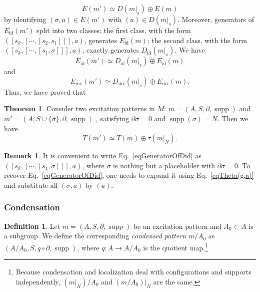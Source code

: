 \documentclass[reprint, amsmath, amssymb, showpacs, floatfix, longbibliography, aps, twocolumn, superscriptaddress, nofootinbib]{revtex4-2}
\newcommand{\supp}{\operatorname{supp}}
\newcommand{\id}{{\operatorname{id}}}
\newcommand{\inv}{{\operatorname{inv}}}
\theoremstyle{definition}
\newtheorem{theorem}{Theorem}[section]
\newtheorem{definition}{Definition}[section]
\newtheorem{remark}{Remark}[section]
\begin{document}
\begin{equation}\label{eqDecomposeD}
	E(m')\simeq D(m|_s)\oplus E(m)
\end{equation}
 by identifying $(\sigma,a)\in E(m')$ with $(a)\in D(m|_s)$. Moreover, generators of $E_{\operatorname{id}}(m')$ split into two classes: the first class, with the form $([s_k,[\cdots,[s_2,s_1]]],a)$, generates $E_{\operatorname{id}}(m)$; the second class, with the form $([s_k,[\cdots,[s_1,\sigma]]],a)$, exactly generates $D_\id(m|_s)$. We have
 \begin{equation}
 	E_\id(m')\simeq D_\id(m|_s)\oplus E_\id(m)
 \end{equation}
 and
\begin{equation}
	E_\inv(m')\simeq D_\inv(m|_s)\oplus E_\inv(m).
\end{equation}
Thus, we have proved that
\begin{theorem}\label{thmSymmetryOperator}
	Consider two excitation patterns in $M$: $m=(A,S,\partial,\supp)$ and $m'=(A,S\cup \{\sigma\},\partial,\supp)$ , satisfying $\partial\sigma=0$ and $\supp(\sigma)=N$. Then we have
	\begin{equation}
		T(m')\simeq T(m)\oplus\tau(m|_N).
	\end{equation}
	
\end{theorem}

\begin{remark}\label{remarkPlaceHolder}
	It is convenient to write Eq.~\eqref{eqGeneratorOfDid} as $([s_k,[\cdots,[s_1,\sigma]]],a)$, where $\sigma$ is nothing but a placeholder with $\partial\sigma=0$. To recover Eq.~\eqref{eqGeneratorOfDid}, one needs to expand it using Eq.~\eqref{eqTheta(g,a)} and substitute all $(\sigma,a)$ by $(a)$.
\end{remark}

\subsubsection{Condensation}\label{subsecCondensation}

\begin{definition}\label{defCondensation}
	Let $m=(A,S,\partial,\supp)$ be an excitation pattern and $A_0\subset A$ is a subgroup. We define the corresponding \textit{condensed pattern} $m/A_0$ as $(A/A_0,S,q\circ \partial,\supp)$, where $q:A\rightarrow A/A_0$ is the quotient map.\footnote{Because condensation and localization deal with configurations and supports independently, $(m|_N)/A_0$ and $(m/A_0)|_N$ are the same.}
\end{definition}
\end{document}
